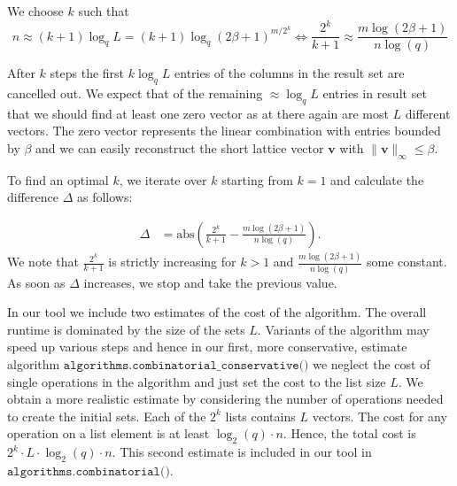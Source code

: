We choose $k$ such that
\begin{equation}
  n \approx (k+1) \log_q L = (k+1) \log_q (2\beta+1)^{m/2^k} \iff \frac{2^k}{k+1} \approx \frac{m \log(2\beta + 1)}{n \log(q)}
\end{equation}

After $k$ steps the first $k \log_q L$ entries of the columns in the result set are cancelled out. We expect that of the remaining $\approx \log_q L$ entries in result set that we should find at least one zero vector as at there again are most $L$ different vectors. The zero vector represents the linear combination with entries bounded by $\beta$ and we can easily reconstruct the short lattice vector $\mathbf{v}$ with $\|\mathbf{v}\|_\infty \leq \beta$.

To find an optimal $k$, we iterate over $k$ starting from $k=1$ and calculate the difference $\Delta$ as follows:

\begin{align}
  \Delta & = \text{abs}\left(\frac{2^k}{k+1} - \frac{m \log(2\beta + 1)}{n \log(q)}\right).
\end{align}
We note that $\frac{2^k}{k+1}$ is strictly increasing for $k>1$ and $\frac{m \log(2\beta + 1)}{n \log(q)}$ some constant. As soon as $\Delta$ increases, we stop and take the previous value.

In our tool we include two estimates of the cost of the algorithm. The overall runtime is dominated by the size of the sets $L$. Variants of the algorithm may speed up various steps and hence in our first, more conservative, estimate algorithm $\texttt{algorithms.combinatorial\_conservative()}$ we neglect the cost of single operations in the algorithm and just set the cost to the list size $L$. We obtain a more realistic estimate by considering the number of operations needed to create the initial sets. Each of the $2^k$ lists contains $L$ vectors. The cost for any operation on a list element is at least $\log_2(q) \cdot n$. Hence, the total cost is $2^k \cdot L \cdot \log_2(q) \cdot n$. This second estimate is included in our tool in $\texttt{algorithms.combinatorial()}$.


